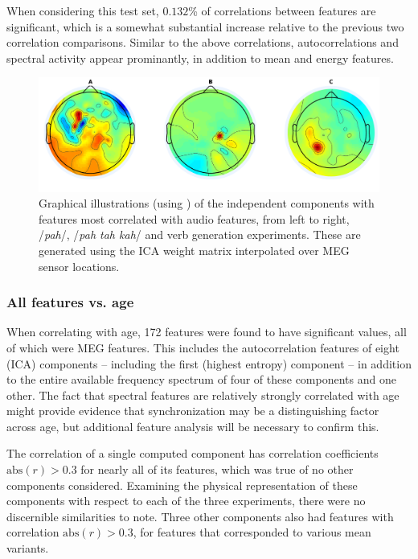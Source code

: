 \documentclass[utf8]{frontiersSCNS} %
\begin{document}
When considering this test set, $0.132$\% of correlations between features are significant, which is a somewhat substantial increase relative to the previous two correlation comparisons. Similar to the above correlations, autocorrelations and spectral activity appear prominantly, in addition to mean and energy features. 

\begin{figure}[t]
  \centering
  \includegraphics[width=\linewidth]{AllComponents.png}
  \caption{Graphical illustrations (using \cite{Delorme04eeglab}) of the independent components with features most correlated with audio features, from left to right, /{\em pah}/, /{\em pah tah kah}/ and verb generation experiments. These are generated using the ICA weight matrix interpolated over MEG sensor locations. }
  \label{fig:components}
\end{figure}
 
\subsubsection{All features vs. age}

When correlating with age, 172 features were found to have significant values, all of which were MEG features. This includes the autocorrelation features of eight (ICA) components -- including the first (highest entropy) component -- in addition to the entire available frequency spectrum of four of these components and one other. The fact that spectral features are relatively strongly correlated with age might provide evidence that synchronization may be a distinguishing factor across age, but additional feature analysis will be necessary to confirm this.

The correlation of a single computed component has correlation coefficients $\text{abs}(r)>0.3$ for nearly all of its features, which was true of no other components considered. Examining the physical representation of these components with respect to each of the three experiments, there were no discernible similarities to note. Three other components also had features with correlation $\text{abs}(r)>0.3$, for features that corresponded to various mean variants.
\end{document}
